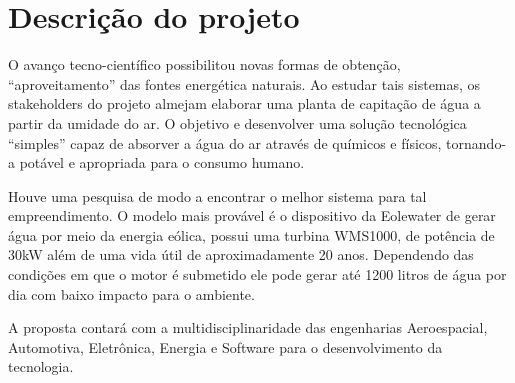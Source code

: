   \section*{Descrição do projeto}

O avanço tecno-científico possibilitou novas formas de obtenção, “aproveitamento” das fontes energética naturais.
Ao estudar tais sistemas, os stakeholders do projeto almejam elaborar uma planta de capitação de água a partir da
umidade do ar. O objetivo e desenvolver uma solução tecnológica “simples” capaz de absorver a água do ar através de
químicos e físicos, tornando-a potável e apropriada para o consumo humano.

Houve uma pesquisa de modo a  encontrar o melhor sistema para tal empreendimento. O modelo mais provável é o dispositivo
da Eolewater de gerar água por meio da energia eólica, possui uma turbina WMS1000, de potência de 30kW além de uma vida
útil de aproximadamente 20 anos. Dependendo das condições em que o motor é submetido ele pode gerar até 1200 litros de
água por dia com baixo impacto para o ambiente.

A proposta contará com a multidisciplinaridade das engenharias Aeroespacial, Automotiva, Eletrônica, Energia e Software 
para o desenvolvimento da tecnologia. 


